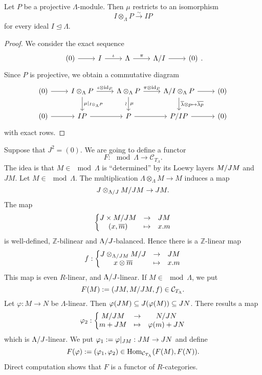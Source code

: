 \begin{lemma*}
Let $P$ be a projective $\Lambda$-module. Then $\mu$ restricts to an isomorphism \[I
\otimes_\Lambda P \xrightarrow{\sim} IP\] for every ideal $I \trianglelefteq \Lambda$.
\end{lemma*}


\begin{proof}
We consider the exact sequence
\[\begin{tikzcd}
(0) \rar& I \rar["\iota"]& \Lambda \rar["\pi"]& \factor \Lambda I \rar& (0)
\end{tikzcd}.\]
Since $P$ is projective, we obtain a commutative diagram
\[\begin{tikzcd}
(0) \rar & I \otimes_\Lambda P \dar["\mu|_{I \otimes_\Lambda P}"] \rar["\iota \otimes \id_P"] & \Lambda \otimes_\Lambda P
\dar["\wr"',"\mu"] \rar["\pi \otimes \id_P"] & \factor \Lambda I \otimes_\Lambda P \dar["\overline \lambda \otimes p
\mapsto \overline{\lambda p}"] \rar & (0) \\
(0) \rar & IP \rar & P \rar & \factor P {IP} \rar & (0)
\end{tikzcd}
\]
with exact rows.
\end{proof}


Suppose that $J^2 = (0)$. We are going to define a functor
\[ F: \mod \Lambda \to \mathcal{C}_{T_\Lambda}.\]
The idea is that $M \in \mod \Lambda$ is “determined” by its Loewy layers $M/J M$ and $J M$.
Let $M \in \mod \Lambda$. The multiplication $\Lambda \otimes_\Lambda M \to M$ induces a map
\[
J \otimes_{\Lambda/J} M/J M \to J M.
\]
The map
\[
\left\{ \begin{matrix} J \times M/J M & \to & J M \\ (x, \overline m) & \mapsto & x.m \end{matrix} \right.
\]
is well-defined, $\mathbb{Z}$-bilinear and $\Lambda/J$-balanced. Hence there is a $\mathbb{Z}$-linear map
\[
f: \left\{ \begin{matrix} J \otimes_{\Lambda/JM}
M/J & \to & J M \\ x \otimes \overline m & \mapsto & x.m \end{matrix} \right.
\]
This map is even $R$-linear, and $\Lambda/J$-linear. If $M \in \mod \Lambda$, we
put
\[
F(M) := (J M, M/J M, f) \in \mathcal{C}_{T_\Lambda}.
\]
Let $\varphi : M \to N$ be $\Lambda$-linear. Then $\varphi(J M) \subseteq J(\varphi(M)) \subseteq J N$. There results a map
\[
\varphi_2: \left\{ \begin{matrix} M/J M & \to & N/J N \\ m + J M & \mapsto & \varphi(m) + J N \end{matrix} \right.
\]
which is $\Lambda/J$-linear. We put $\varphi_1 := {\varphi}|_{J M} : J M
\to J N$ and define
\[
F(\varphi) := (\varphi_1, \varphi_2) \in \operatorname{Hom}_{\mathcal{C}_{T_\Lambda}}(F(M), F(N)).
\]
Direct computation shows that $F$ is a functor of $R$-categories.

